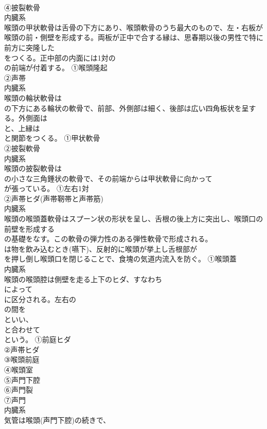 \documentclass[8pt]{extreport}
\begin{document}
\begin{CJK}{UTF8}{min}
\\	④披裂軟骨
\\	内臓系
\\	喉頭の甲状軟骨は舌骨の下方にあり、喉頭軟骨のうち最大のもので、左・右板が喉頭の前・側壁を形成する。両板が正中で合する縁は、思春期以後の男性で特に前方に突隆した
\\	をつくる。正中部の内面には1対の
\\	の前端が付着する。	①喉頭隆起
\\	②声帯
\\	内臓系
\\	喉頭の輪状軟骨は
\\	の下方にある輪状の軟骨で、前部、外側部は細く、後部は広い四角板状を呈する。外側面は
\\	と、上縁は
\\	と関節をつくる。	①甲状軟骨
\\	②披裂軟骨
\\	内臓系
\\	喉頭の披裂軟骨は
\\	の小さな三角錘状の軟骨で、その前端からは甲状軟骨に向かって
\\	が張っている。	①左右1対
\\	②声帯ヒダ(声帯靭帯と声帯筋)
\\	内臓系
\\	喉頭の喉頭蓋軟骨はスプーン状の形状を呈し、舌根の後上方に突出し、喉頭口の前壁を形成する
\\	の基礎をなす。この軟骨の弾力性のある弾性軟骨で形成される。
\\	は物を飲み込むとき(嚥下)、反射的に喉頭が挙上し舌根部が
\\	を押し倒し喉頭口を閉じることで、食塊の気道内流入を防ぐ。	①喉頭蓋
\\	内臓系
\\	喉頭の喉頭腔は側壁を走る上下のヒダ、すなわち
\\	によって
\\	に区分される。左右の
\\	の間を
\\	といい、
\\	と合わせて
\\	という。	①前庭ヒダ
\\	②声帯ヒダ
\\	③喉頭前庭
\\	④喉頭室
\\	⑤声門下腔
\\	⑥声門裂
\\	⑦声門
\\	内臓系
\\	気管は喉頭(声門下腔)の続きで、

\end{CJK}
\end{document}
